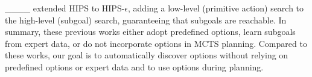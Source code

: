 ____ extended HIPS to HIPS-$\epsilon$, adding a low-level (primitive action) search to the high-level (subgoal) search, guaranteeing that subgoals are reachable.
In summary, these previous works either adopt predefined options, learn subgoals from expert data, or do not incorporate options in MCTS planning.
Compared to these works, our goal is to automatically discover options without relying on predefined options or expert data and to use options during planning.

%